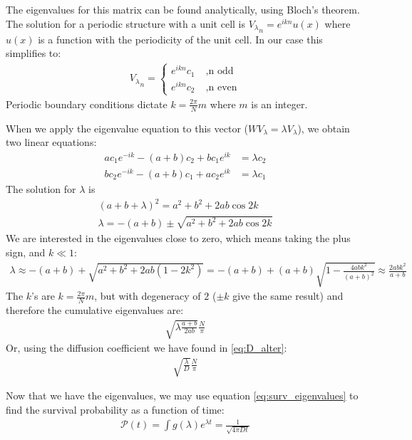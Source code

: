 \documentclass[onecolumn,fleqn,notitlepage,secnumarabic]{revtex4}
\begin{document}
The eigenvalues for this matrix can be found analytically, using Bloch's theorem. The solution for a periodic structure with a unit cell is ${V_\lambda}_n = e^{ikn} u(x)$ where $u(x)$ is a function with the periodicity of the unit cell. In our case this simplifies to:
\begin{align}
{V_\lambda}_n = \begin{cases}e^{ikn} c_1 \; &, \text{n odd} \\ e^{ikn} c_2 \; &, \text{n even} \end{cases}
\end{align}
Periodic boundary conditions dictate $k=\frac{2\pi}{N}m$ where $m$ is an integer.

When we apply the eigenvalue equation to this vector ($WV_\lambda = \lambda V_\lambda$), we obtain two linear equations:
\begin{align}
ac_1e^{-ik}   -(a+b)c_2 +bc_1e^{ik} &= \lambda c_2 \\
bc_2e^{-ik}   -(a+b)c_1 +ac_2e^{ik} &= \lambda c_1 
\end{align}
The solution for $\lambda$ is
\begin{align}
(a+b+\lambda)^2 = a^2+b^2+2ab\cos 2k \\
\lambda = -(a + b) \pm \sqrt{a^2+b^2+2ab\cos 2k}  \label{eq:abab_eigenvals}
\end{align}
We are interested in the eigenvalues close to zero, which means taking the plus sign, and $k\ll 1$:
\begin{align}
\lambda \approx -(a + b) + \sqrt{a^2+b^2+2ab(1-2k^2)} = -(a+b) +(a+b)\sqrt{1 - \frac{4abk^2}{(a+b)^2}}\approx \frac{2abk^2}{a+b}
\end{align}
The $k$'s are $k=\frac{2\pi}{N}m$, but with degeneracy of $2$ ($\pm k$ give the same result) and therefore the cumulative eigenvalues are:
\begin{align}
\sqrt{\lambda\frac{a+b}{2ab}}\frac{N}{\pi}
\end{align}
Or, using the diffusion coefficient we have found in \eqref{eq:D_alter}:
\begin{align}
\sqrt{\frac{\lambda}{D}}\frac{N}{\pi}
\end{align}

Now that we have the eigenvalues, we may use equation \ref{eq:surv_eigenvalues} to find the survival probability as a function of time:
\begin{align}
\mathcal{P}(t) =\int g(\lambda) e^{\lambda t} = \frac{1}{\sqrt{4 \pi D t}}
\end{align}
\end{document}
